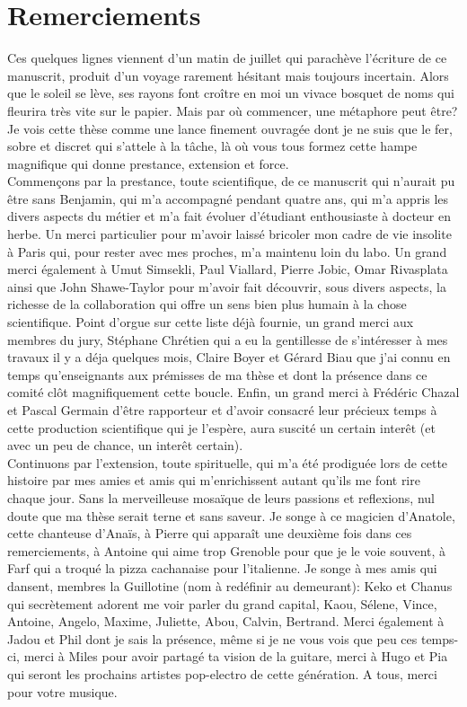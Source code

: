 \section*{Remerciements}

Ces quelques lignes viennent d'un matin de juillet qui parachève l'écriture de ce manuscrit, produit d'un voyage rarement hésitant mais toujours incertain. Alors que le soleil se lève, ses rayons font croître en moi un vivace bosquet de noms qui fleurira très vite sur le papier. 
Mais par où commencer, une métaphore peut être? Je vois cette thèse comme une lance finement ouvragée dont je ne suis que le fer, sobre et discret qui s'attele à la tâche, là où vous tous formez cette hampe magnifique qui donne prestance, extension et force.\\
Commençons par la prestance, toute scientifique, de ce manuscrit qui n'aurait pu être sans Benjamin, qui m'a accompagné pendant quatre ans, qui m'a appris les divers aspects du métier et m'a fait évoluer d'étudiant enthousiaste à docteur en herbe. Un merci particulier pour m'avoir laissé bricoler mon cadre de vie insolite à Paris qui, pour rester avec mes proches, m'a maintenu loin du labo. Un grand merci également à Umut Simsekli, Paul Viallard, Pierre Jobic, Omar Rivasplata ainsi que John Shawe-Taylor pour m'avoir fait découvrir, sous divers aspects, la richesse de la collaboration qui offre un sens bien plus humain à la chose scientifique. Point d'orgue sur cette liste déjà fournie, un grand merci aux membres du jury, Stéphane Chrétien qui a eu la gentillesse de s'intéresser à mes travaux il y a déja quelques mois, Claire Boyer et Gérard Biau que j'ai connu en temps qu'enseignants aux prémisses de ma thèse et dont la présence dans ce comité clôt magnifiquement cette boucle. Enfin, un grand merci à Frédéric Chazal et Pascal Germain d'être rapporteur et d'avoir consacré leur précieux temps à cette production scientifique qui je l'espère, aura suscité un certain interêt (et avec un peu de chance, un interêt certain).\\
Continuons par l'extension, toute spirituelle, qui m'a été prodiguée lors de cette histoire par mes amies et amis qui m'enrichissent autant qu'ils me font rire chaque jour. Sans la merveilleuse mosaïque de leurs passions et reflexions, nul doute que ma thèse serait terne et sans saveur. Je songe à ce magicien d'Anatole, cette chanteuse d'Anaïs, à Pierre qui apparaît une deuxième fois dans ces remerciements, à Antoine qui aime trop Grenoble pour que je le voie souvent, à Farf qui a troqué la pizza cachanaise pour l'italienne. Je songe à mes amis qui dansent, membres la Guillotine (nom à redéfinir au demeurant): Keko et Chanus qui secrètement adorent me voir parler du grand capital, Kaou, Sélene, Vince, Antoine, Angelo, Maxime, Juliette, Abou, Calvin, Bertrand. Merci également à Jadou et Phil dont je sais la présence, même si je ne vous vois que peu ces temps-ci, merci à Miles pour avoir partagé ta vision de la guitare, merci à Hugo et Pia qui seront les prochains artistes pop-electro de cette génération. A tous, merci pour votre musique. 
